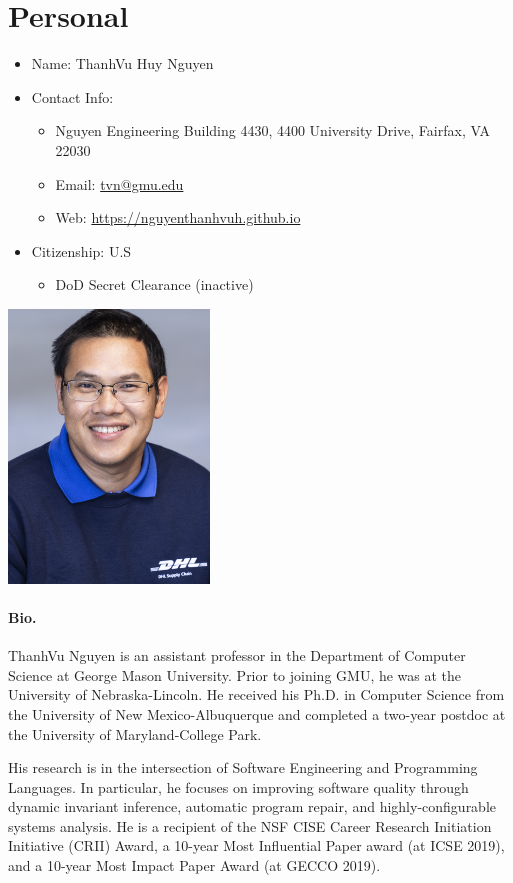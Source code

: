 \documentclass[11pt]{article}
\makeatletter
\newcommand{\myname}{ThanhVu Huy Nguyen}
\newcommand{\mynamevn}{Nguy$\tilde{\hat{\text{e}}}$n Huy ThanhV$\tilde{\text{u}}$}
\newcommand{\myemailwork}{tvn@gmu.edu}
\newcommand{\myweb}{https://nguyenthanhvuh.github.io}
\newcommand{\emailweb}{
\item Email: \href{mailto:\myemailwork}{\myemailwork}
\item Web: \url{\myweb}
}
\makeatother
\begin{document}
{
  \section{Personal}

  \begin{minipage}{.8\textwidth}
    \begin{itemize}
    \item Name: \myname{}
    \item Contact Info:
      \begin{itemize}
        \item Nguyen Engineering Building 4430, 4400 University Drive, Fairfax, VA 22030
        \emailweb{}
      \end{itemize}
    \item Citizenship: U.S
      \begin{itemize}
      \item DoD Secret Clearance (inactive)
      \end{itemize}
    \end{itemize}
  \end{minipage}
  \begin{minipage}{.3\textwidth}
    \includegraphics[width=0.4\textwidth]{tvn.png}
  \end{minipage}

  \paragraph{Bio.} ThanhVu Nguyen is an assistant professor in the Department of Computer Science at George Mason University. 
  Prior to joining GMU, he was at the University of Nebraska-Lincoln. He received his Ph.D. in Computer Science from the University of New Mexico-Albuquerque and completed a two-year postdoc at the University of Maryland-College Park.

  His research is in the intersection of Software Engineering and Programming Languages. In particular, he focuses on improving software quality through dynamic invariant inference,  automatic program repair, and highly-configurable systems analysis.
He is a recipient of the NSF CISE Career Research Initiation Initiative (CRII) Award, a 10-year Most Influential Paper award (at ICSE 2019), and a 10-year Most Impact Paper Award (at GECCO 2019).
}
\end{document}
